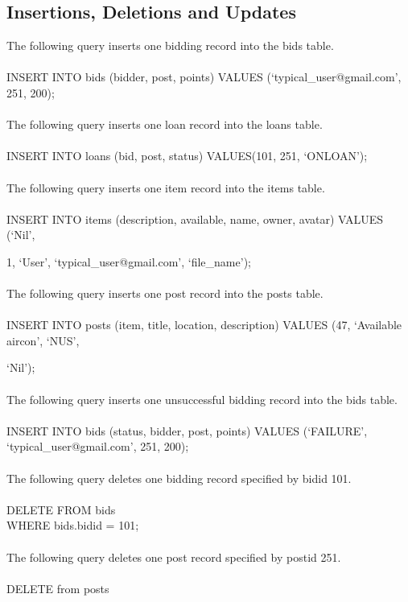 \subsection{Insertions, Deletions and Updates}
The following query inserts one bidding record into the bids table.\\\\
INSERT INTO bids (bidder, post, points) VALUES (`typical\_user@gmail.com', 251, 200);\\\\
The following query inserts one loan record into the loans table.\\\\
INSERT INTO loans (bid, post, status) VALUES(101, 251, `ONLOAN');\\\\
The following query inserts one item record into the items table.\\\\
INSERT INTO items (description, available, name, owner, avatar) VALUES (`Nil', \\ \strut\hspace*{3ex}1, `User', `typical\_user@gmail.com', `file\_name');\\\\
The following query inserts one post record into the posts table.\\\\
INSERT INTO posts (item, title, location, description) VALUES (47, `Available aircon', `NUS', \\ \strut\hspace*{3ex} `Nil');\\\\
The following query inserts one unsuccessful bidding record into the bids table.\\\\
INSERT INTO bids (status, bidder, post, points) VALUES (`FAILURE', `typical\_user@gmail.com', 251, 200);\\\\
The following query deletes one bidding record specified by bidid 101.\\\\
DELETE FROM bids\\
WHERE bids.bidid = 101;\\\\
The following query deletes one post record specified by postid 251.\\\\
DELETE from posts\\
